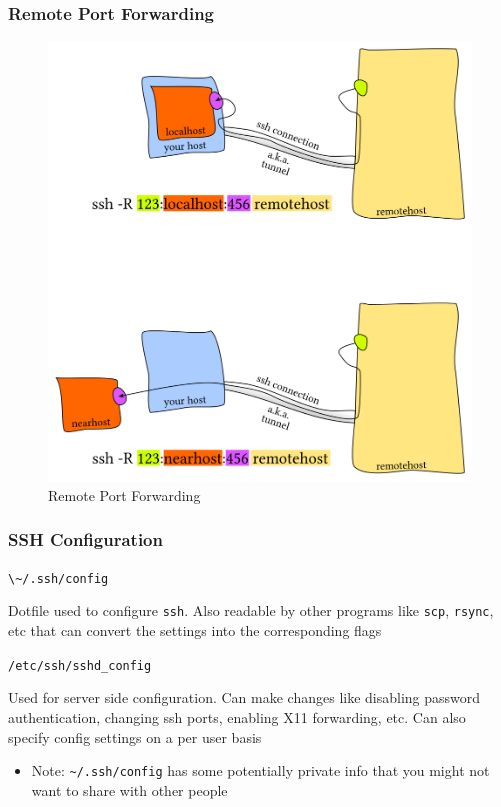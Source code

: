 \documentclass[letterpaper,12pt]{article}
\newcommand*{\lstitem}[1]{
  \setbox0\hbox{\lstinline{#1}}
  \item[\usebox0]
}
\begin{document}
\subsubsection{Remote Port Forwarding}
\begin{figure}[H]
  \includegraphics[width=160mm, scale=0.75]{pictures/remote-port-forwarding.png}
  \caption{Remote Port Forwarding}
\end{figure}

\subsubsection{SSH Configuration}

\begin{description}
  \lstitem{\~/.ssh/config} Dotfile used to configure \lstinline{ssh}. Also readable by other programs like \lstinline{scp}, \lstinline{rsync}, etc that can convert the settings into the corresponding flags
  \lstitem{/etc/ssh/sshd_config} Used for server side configuration. Can make changes like disabling password authentication, changing ssh ports, enabling X11 forwarding, etc. Can also specify config settings on a per user basis
\end{description}

\begin{itemize}
  \item Note: \lstinline{~/.ssh/config} has some potentially private info that you might not want to share with other people
\end{itemize}
\end{document}
